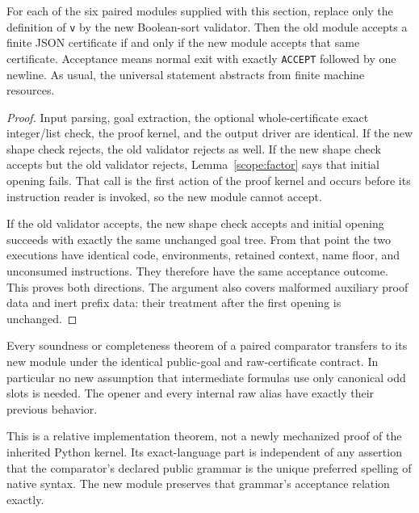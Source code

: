 \begin{theorem}
\label{scope:checker}
For each of the six paired modules supplied with this section, replace
only the definition of \texttt{v} by the new Boolean-sort validator.
Then the old module accepts a finite JSON certificate if and only if
the new module accepts that same certificate. Acceptance means normal
exit with exactly \texttt{ACCEPT} followed by one newline. As usual,
the universal statement abstracts from finite machine resources.
\end{theorem}
\begin{proof}
Input parsing, goal extraction, the optional whole-certificate exact
integer/list check, the proof kernel, and the output driver are identical.
If the new shape check rejects, the old validator rejects as well.
If the new shape check accepts but the old validator rejects,
Lemma~\ref{scope:factor} says that initial opening fails. That call is
the first action of the proof kernel and occurs before its instruction
reader is invoked, so the new module cannot accept.

If the old validator accepts, the new shape check accepts and initial
opening succeeds with exactly the same unchanged goal tree. From that
point the two executions have identical code, environments, retained
context, name floor, and unconsumed instructions. They therefore have
the same acceptance outcome. This proves both directions. The argument
also covers malformed auxiliary proof data and inert prefix data:
their treatment after the first opening is unchanged.
\end{proof}

\begin{corollary}
Every soundness or completeness theorem of a paired comparator transfers
to its new module under the identical public-goal and raw-certificate
contract. In particular no new assumption that intermediate formulas
use only canonical odd slots is needed. The opener and every internal
raw alias have exactly their previous behavior.
\end{corollary}

This is a relative implementation theorem, not a newly mechanized proof
of the inherited Python kernel. Its exact-language part is independent
of any assertion that the comparator's declared public grammar is the
unique preferred spelling of native syntax. The new module preserves
that grammar's acceptance relation exactly.

